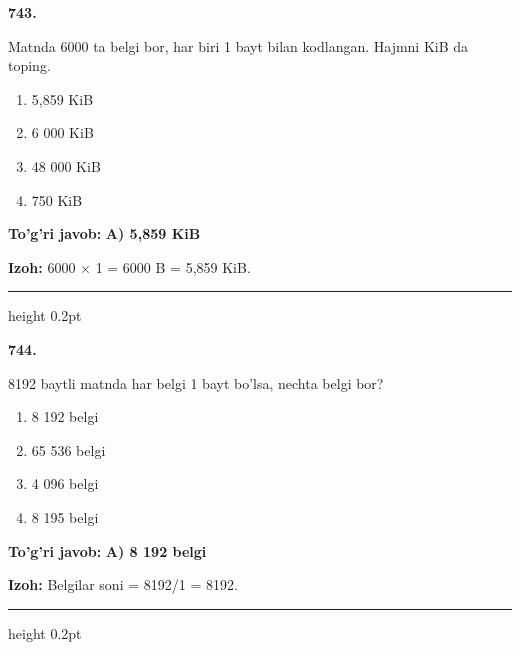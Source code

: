 \documentclass[10pt,a4paper,oneside]{article}
\begin{document}
\noindent\textbf{\color{ink}743.}
\par
Matnda 6000 ta belgi bor, har biri 1 bayt bilan kodlangan. Hajmni KiB da toping.
\begin{enumerate}[label=\Alph*),leftmargin=9mm]
\item 5,859 KiB
\item 6 000 KiB
\item 48 000 KiB
\item 750 KiB
\end{enumerate}
\begin{tcolorbox}[enhanced,breakable,colback=teal!4,colframe=teal!50!black,boxrule=0.5pt,arc=1.1mm,left=3mm,right=3mm,top=1.7mm,bottom=1.7mm,before skip=2mm,after skip=2mm]
\textbf{\color{teal}To'g'ri javob:} \textbf{A) 5,859 KiB}
\par\smallskip
\textbf{Izoh:} 6000 \ensuremath{\times} 1 = 6000 B = 5,859 KiB.
\end{tcolorbox}
\vspace{2mm}\hrule height 0.2pt \vspace{3mm}

\noindent\textbf{\color{ink}744.}
\par
8192 baytli matnda har belgi 1 bayt bo'lsa, nechta belgi bor?
\begin{enumerate}[label=\Alph*),leftmargin=9mm]
\item 8 192 belgi
\item 65 536 belgi
\item 4 096 belgi
\item 8 195 belgi
\end{enumerate}
\begin{tcolorbox}[enhanced,breakable,colback=teal!4,colframe=teal!50!black,boxrule=0.5pt,arc=1.1mm,left=3mm,right=3mm,top=1.7mm,bottom=1.7mm,before skip=2mm,after skip=2mm]
\textbf{\color{teal}To'g'ri javob:} \textbf{A) 8 192 belgi}
\par\smallskip
\textbf{Izoh:} Belgilar soni = 8192/1 = 8192.
\end{tcolorbox}
\vspace{2mm}\hrule height 0.2pt \vspace{3mm}
\end{document}

